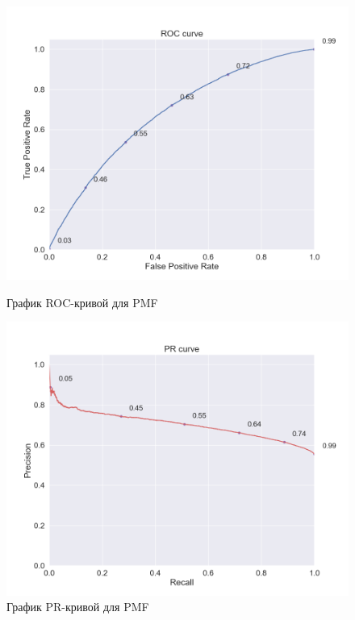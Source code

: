 \begin{figure}[h!]
\centering
\begin{minipage}{.5\textwidth}
\centering
\includegraphics[width=1.0\linewidth]{images/pmf_sgd/roc_curve}
\caption{График ROC-кривой для PMF}
\label{fig:pmf_sgd_roc}
\end{minipage}%
\begin{minipage}{.5\textwidth}
\centering
\includegraphics[width=1.0\linewidth]{images/pmf_sgd/pr_curve}
\caption{График PR-кривой для PMF}
\label{fig:pmf_sgd_pr}
\end{minipage}
\end{figure}

